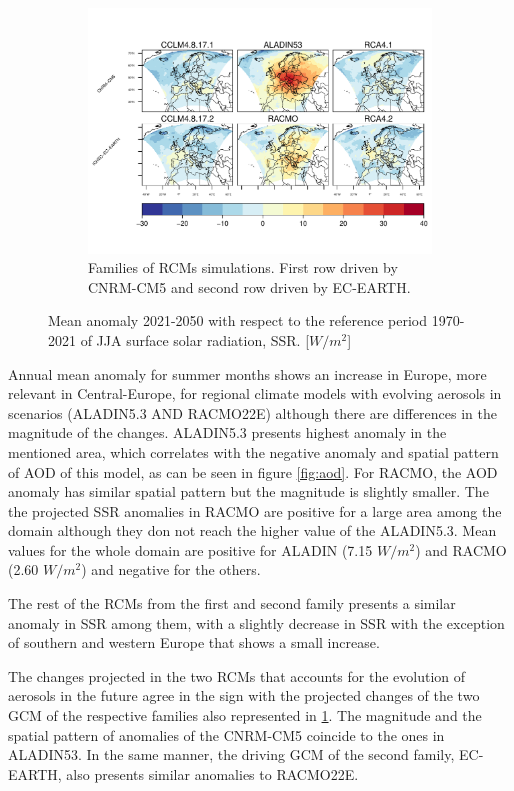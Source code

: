 \begin{figure}[h]
\begin{subfigure}{1\textwidth}
    \includegraphics[width=1\textwidth]{figs/capitulo7/ANOMALIAS_JJA_SSR_2050-2021_r12.pdf}
    \caption{Families of RCMs simulations. First row driven by CNRM-CM5 and second row driven by EC-EARTH.}
  \end{subfigure}
  \caption{Mean anomaly 2021-2050 with respect to the reference period 1970-2021 of JJA surface solar radiation, SSR. [$W/m^2$]}
    \label{fig:anomalySSR}
\end{figure}

Annual mean anomaly for summer months shows an increase in Europe, more relevant in Central-Europe, for regional climate models with evolving aerosols in scenarios (ALADIN5.3 AND RACMO22E) although there are differences in the magnitude of the changes. ALADIN5.3 presents highest anomaly in the mentioned area, which correlates with the negative anomaly and spatial pattern of AOD of this model, as can be seen in figure \ref{fig:aod}. For RACMO, the AOD anomaly has similar spatial pattern but the magnitude is slightly smaller. The the projected SSR anomalies in RACMO are positive for a large area among the domain although they don not reach the higher value of the ALADIN5.3. Mean values for the whole domain are positive for ALADIN (7.15 $W/m^2$) and RACMO (2.60 $W/m^2$) and negative for the others.

The rest of the RCMs from the first and second family presents a similar anomaly in SSR among them, with a slightly decrease in SSR with the exception of southern and western Europe that shows a small increase.

The changes projected in the two RCMs that accounts for the evolution of aerosols in the future agree in the sign with the projected changes of the two GCM of the respective families also represented in \ref{fig:anomalySSR}. The magnitude and the spatial pattern of anomalies of the CNRM-CM5 coincide to the ones in ALADIN53. In the same manner, the driving GCM of the second family, EC-EARTH, also presents similar anomalies to RACMO22E. 

